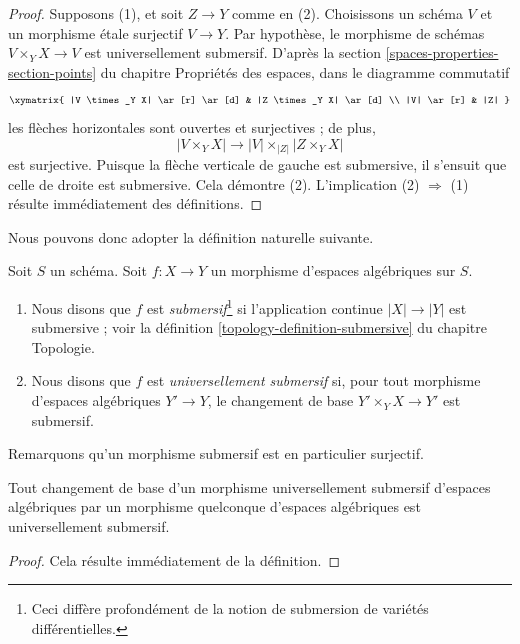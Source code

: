 \begin{proof}
Supposons (1), et soit $Z \to Y$ comme en (2). Choisissons un schéma $V$ et
un morphisme \'etale surjectif $V \to Y$. Par hypothèse, le morphisme de
schémas $V \times_Y X \to V$ est universellement submersif. D'après la
section \ref{spaces-properties-section-points} du chapitre Propriétés des espaces,
dans le diagramme commutatif
$$
\xymatrix{
|V \times_Y X| \ar[r] \ar[d] & |Z \times_Y X| \ar[d] \\
|V| \ar[r] & |Z|
}
$$
les flèches horizontales sont ouvertes et surjectives ; de plus,
$$
|V \times_Y X| \longrightarrow |V| \times_{|Z|} |Z \times_Y X|
$$
est surjective. Puisque la flèche verticale de gauche est submersive,
il s'ensuit que celle de droite est submersive.
Cela démontre (2). L'implication (2) $\Rightarrow$ (1) résulte
immédiatement des définitions.
\end{proof}

\noindent
Nous pouvons donc adopter la définition naturelle suivante.

\begin{definition}
\label{definition-submersive}
Soit $S$ un schéma.
Soit $f : X \to Y$ un morphisme d'espaces algébriques sur $S$.
\begin{enumerate}
\item Nous disons que $f$ est {\it submersif}\footnote{Ceci diffère profondément
de la notion de submersion de variétés différentielles.}
si l'application continue $|X| \to |Y|$ est submersive ; voir la
définition \ref{topology-definition-submersive} du chapitre Topologie.
\item Nous disons que $f$ est {\it universellement submersif} si, pour tout
morphisme d'espaces algébriques $Y' \to Y$, le changement de base
$Y' \times_Y X \to Y'$ est submersif.
\end{enumerate}
\end{definition}

\noindent
Remarquons qu'un morphisme submersif est en particulier surjectif.

\begin{lemma}
\label{lemma-base-change-universally-submersive}
Tout changement de base d'un morphisme universellement submersif d'espaces algébriques
par un morphisme quelconque d'espaces algébriques est universellement submersif.
\end{lemma}

\begin{proof}
Cela résulte immédiatement de la définition.
\end{proof}

